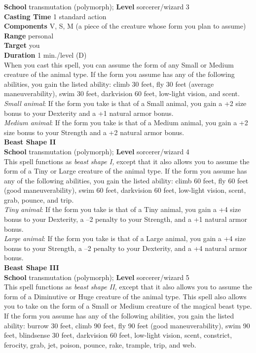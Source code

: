 \textbf{School }transmutation (polymorph); \textbf{Level }sorcerer/wizard 3\\
\textbf{Casting Time }1 standard action\\
\textbf{Components }V, S, M (a piece of the creature whose form you plan to assume)\\
\textbf{Range }personal\\
\textbf{Target }you\\
\textbf{Duration }1 min./level (D)\\
When you cast this spell, you can assume the form of any Small or Medium creature of the animal type. If the form you assume has any of the following abilities, you gain the listed ability: climb 30 feet, fly 30 feet (average maneuverability), swim 30 feet, darkvision 60 feet, low-light vision, and scent.\\
\textit{Small animal}: If the form you take is that of a Small animal, you gain a +2 size bonus to your Dexterity and a +1 natural armor bonus.\\
\textit{Medium animal}: If the form you take is that of a Medium animal, you gain a +2 size bonus to your Strength and a +2 natural armor bonus.\\
\textbf{Beast Shape II}\\
\textbf{School} transmutation (polymorph); \textbf{Level} sorcerer/wizard 4\\
This spell functions as \textit{beast shape I,} except that it also allows you to assume the form of a Tiny or Large creature of the animal type. If the form you assume has any of the following abilities, you gain the listed ability: climb 60 feet, fly 60 feet (good maneuverability), swim 60 feet, darkvision 60 feet, low-light vision, scent, grab, pounce, and trip.\\
\textit{Tiny animal}: If the form you take is that of a Tiny animal, you gain a +4 size bonus to your Dexterity, a --2 penalty to your Strength, and a +1 natural armor bonus.\\
\textit{Large animal}: If the form you take is that of a Large animal, you gain a +4 size bonus to your Strength, a --2 penalty to your Dexterity, and a +4 natural armor bonus.\\
\textbf{Beast Shape III}\\
\textbf{School }transmutation (polymorph); \textbf{Level }sorcerer/wizard 5\\
This spell functions as \textit{beast shape II, }except that it also allows you to assume the form of a Diminutive or Huge creature of the animal type. This spell also allows you to take on the form of a Small or Medium creature of the magical beast type. If the form you assume has any of the following abilities, you gain the listed ability: burrow 30 feet, climb 90 feet, fly 90 feet (good maneuverability), swim 90 feet, blindsense 30 feet, darkvision 60 feet, low-light vision, scent, constrict, ferocity, grab, jet, poison, pounce, rake, trample, trip, and web.\\
